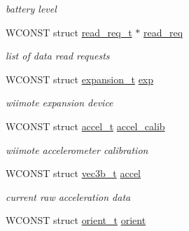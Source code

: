 \begin{DoxyCompactItemize}
\begin{DoxyCompactList}\small\item\em battery level \end{DoxyCompactList}\item 
\hypertarget{structwiimote__t_ac192abc14dc9355c9a161f9390a803ae}{\-W\-C\-O\-N\-S\-T struct \hyperlink{structread__req__t}{read\-\_\-req\-\_\-t} $\ast$ \hyperlink{structwiimote__t_ac192abc14dc9355c9a161f9390a803ae}{read\-\_\-req}}\label{structwiimote__t_ac192abc14dc9355c9a161f9390a803ae}

\begin{DoxyCompactList}\small\item\em list of data read requests \end{DoxyCompactList}\item 
\hypertarget{structwiimote__t_a50eb2a01ebd5e702c38890459070899e}{\-W\-C\-O\-N\-S\-T struct \hyperlink{structexpansion__t}{expansion\-\_\-t} \hyperlink{structwiimote__t_a50eb2a01ebd5e702c38890459070899e}{exp}}\label{structwiimote__t_a50eb2a01ebd5e702c38890459070899e}

\begin{DoxyCompactList}\small\item\em wiimote expansion device \end{DoxyCompactList}\item 
\hypertarget{structwiimote__t_a70eedb03dbfcfdc6e588110a680d177d}{\-W\-C\-O\-N\-S\-T struct \hyperlink{structaccel__t}{accel\-\_\-t} \hyperlink{structwiimote__t_a70eedb03dbfcfdc6e588110a680d177d}{accel\-\_\-calib}}\label{structwiimote__t_a70eedb03dbfcfdc6e588110a680d177d}

\begin{DoxyCompactList}\small\item\em wiimote accelerometer calibration \end{DoxyCompactList}\item 
\hypertarget{structwiimote__t_a479d5a06ad78fc175ef5876b9686867c}{\-W\-C\-O\-N\-S\-T struct \hyperlink{structvec3b__t}{vec3b\-\_\-t} \hyperlink{structwiimote__t_a479d5a06ad78fc175ef5876b9686867c}{accel}}\label{structwiimote__t_a479d5a06ad78fc175ef5876b9686867c}

\begin{DoxyCompactList}\small\item\em current raw acceleration data \end{DoxyCompactList}\item 
\hypertarget{structwiimote__t_a793dc495a39c2ae4a4a6cd875094070d}{\-W\-C\-O\-N\-S\-T struct \hyperlink{structorient__t}{orient\-\_\-t} \hyperlink{structwiimote__t_a793dc495a39c2ae4a4a6cd875094070d}{orient}}\label{structwiimote__t_a793dc495a39c2ae4a4a6cd875094070d}


\end{DoxyCompactItemize}
